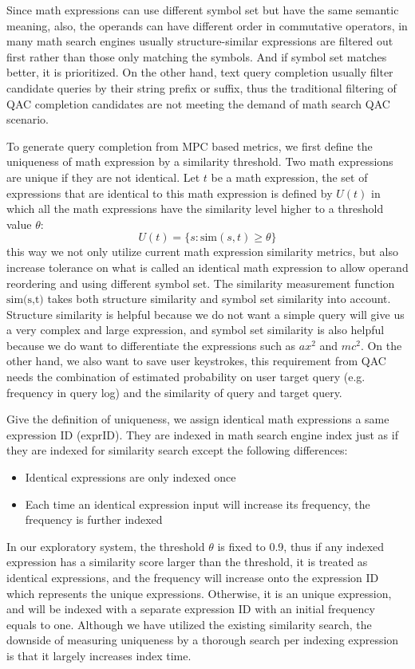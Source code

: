 \documentclass[12pt]{article} %
\begin{document}
Since math expressions can use different symbol set but have the same semantic meaning, also, the operands can have different order in commutative operators,
in many math search engines usually structure-similar expressions are filtered out first rather than those only matching the symbols.
And if symbol set matches better, it is prioritized.
On the other hand, text query completion usually filter candidate queries by their string prefix or suffix, thus the traditional filtering of QAC completion candidates are not meeting the demand of math search QAC scenario.

To generate query completion from MPC based metrics, we first define the uniqueness of math expression by a similarity threshold.
Two math expressions are unique if they are not identical.
Let $t$ be a math expression, the set of expressions that are identical to this math expression is defined by $U(t)$ in which all the math expressions have the similarity level higher to a threshold value $\theta$:
$$
U(t) = \{s: \text{sim}(s, t) \ge \theta\}
$$
this way we not only utilize current math expression similarity metrics,
but also increase tolerance on what is called an identical math expression to allow operand reordering and using different symbol set.
The similarity measurement function $\text{sim(s,t)}$ takes both structure similarity and symbol set similarity into account.
Structure similarity is helpful because we do not want a simple query will give us a very complex and large expression, and symbol set similarity is also helpful because we do want to differentiate the expressions such as $ax^2$ and $mc^2$.
On the other hand, we also want to save user keystrokes, this requirement from QAC needs the combination of estimated probability on user target query (e.g. frequency in query log) and the similarity of query and target query.

Give the definition of uniqueness, we assign identical math expressions a same expression ID (exprID). They are indexed in math search engine index just as if they are indexed for similarity search except the following differences:
\begin{itemize}
\item Identical expressions are only indexed once
\item Each time an identical expression input will increase its frequency, the frequency is further
indexed
\end{itemize}

In our exploratory system, the threshold $\theta$ is fixed to 0.9,
thus if any indexed expression has a similarity score larger than
the threshold, it is treated as identical expressions, and the frequency will
increase onto the expression ID which represents the unique expressions.
Otherwise, it is an unique expression, and will be indexed with a separate
expression ID with an initial frequency equals to one.
Although we have utilized the existing similarity search, the
downside of measuring uniqueness by a thorough search per indexing
expression is that it largely increases index time.
\end{document}

